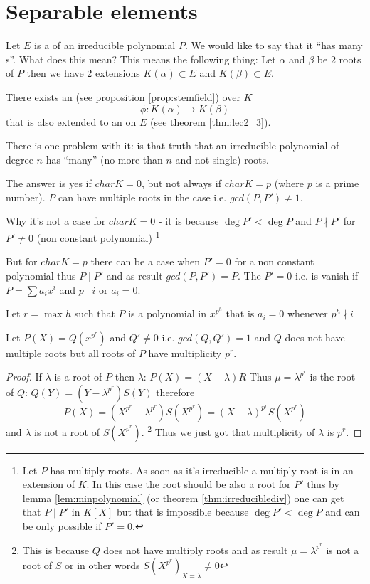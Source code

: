 \section{Separable elements}

Let $E$ is a  of an irreducible polynomial
$P$. We would like to say that it ``has many
s''. What does this mean? This means the
following thing:
Let $\alpha$ and $\beta$ be 2 roots of $P$ then we have 2 extensions
$K\left(\alpha\right) \subset E$ and 
$K\left(\beta\right) \subset E$.

There exists an  (see proposition
\ref{prop:stemfield}) over $K$
\[
\phi: K\left(\alpha\right) \to K\left(\beta\right)
\]
that is also extended to an  on $E$
(see theorem \ref{thm:lec2_3}).

There is one problem with it: is that truth that an irreducible
polynomial of degree $n$ has ``many'' (no more than $n$ and not
single) roots.

The answer is yes if $char K = 0$, but not always if $char K = p$
(where $p$ is a prime number). $P$ can have multiple roots in the case
i.e. $gcd(P, P') \ne 1$.

Why it's not a case for $char K = 0$ - it is because
$\deg P' < \deg P$ and $P \nmid P'$ for $P' \ne 0$ (non constant
polynomial)
\footnote{
  Let $P$ has multiply roots. As soon as it's irreducible a multiply
  root is in an extension of $K$. In this case the root should be also
  a root for $P'$ thus by lemma \ref{lem:minpolynomial} (or
  theorem \ref{thm:irreduciblediv}) one can get
  that $P \mid P'$ in $K\left[X\right]$ but that is impossible because
  $\deg P' < \deg P$ and can be only possible if $P' = 0$.
}

But for $char K = p$ there can be a case when $P' = 0$ for a non
constant polynomial thus $P \mid P'$ and as result $gcd(P, P') = P$.
The $P' = 0$ i.e. is vanish if
$P = \sum a_i x^i$ and $p \mid i$ or $a_i = 0$.

Let $r = \max h$ such that $P$ is a polynomial in $x^{p^h}$ that is
$a_i = 0$ whenever $p^h \nmid i$

\begin{proposition}
  Let $P\left(X\right) = Q\left(x^{p^r}\right)$ and $Q' \ne 0$ i.e.
  $gcd(Q, Q') = 1$ and $Q$ does not have multiple roots but
  all roots of $P$ have multiplicity $p^r$.
  \begin{proof}
    If $\lambda$ is a root of $P$ then $\lambda$:
    $P(X) = (X - \lambda)R$
    Thus $\mu = \lambda^{p^r}$ is the root of $Q$:
    $Q(Y) = (Y - \lambda^{p^r}) S(Y)$ therefore
    \[
    P(X) =
    \left(X^{p^r} - \lambda^{p^r}\right)S\left(X^{p^r}\right) =
    \left(X - \lambda\right)^{p^r}S\left(X^{p^r}\right)
    \]
    and $\lambda$ is not a root of $S\left(X^{p^r}\right)$.
    \footnote{
      This is because $Q$ does not have multiply roots and as result
      $\mu = \lambda^{p^r}$ is not a root of $S$ or in other words
      $S\left(X^{p^r}\right)_{X=\lambda} \ne 0$
      }
    Thus we just got that multiplicity of $\lambda$ is $p^r$.
  \end{proof}
  \label{prop:lect3_1}
\end{proposition}

